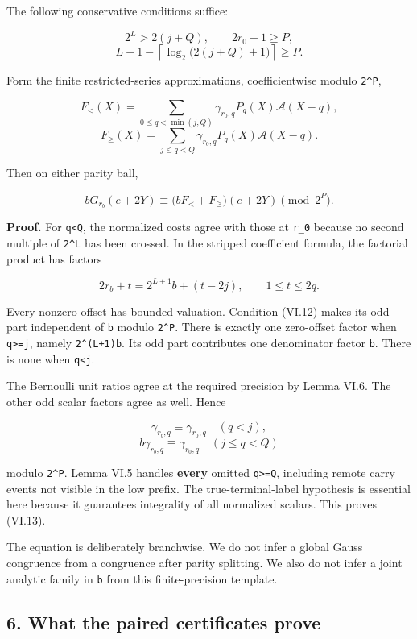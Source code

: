 \documentclass[11pt,letterpaper]{article}
\begin{document}
The following conservative conditions suffice:

\[
2^L>2(j+Q),\qquad 2r_0-1\ge P,
\] \[
L+1-\left\lceil\log_2\bigl(2(j+Q)+1\bigr)\right\rceil\ge P.
\tag{VI.12}
\]

Form the finite restricted-series approximations, coefficientwise modulo \texttt{2\^{}P},

\[
F_{<}(X)=\sum_{0\le q<\min(j,Q)}
\gamma_{r_0,q}P_q(X)\mathscr A(X-q),
\] \[
F_{\ge}(X)=\sum_{j\le q<Q}
\gamma_{r_0,q}P_q(X)\mathscr A(X-q).
\]

Then on either parity ball,

\[
\boxed{
bG_{r_b}(e+2Y)
\equiv
\bigl(bF_<+F_{\ge}\bigr)(e+2Y)
\pmod{2^P}.
} \tag{VI.13}
\]

\textbf{Proof.} For \texttt{q\textless{}Q}, the normalized costs agree with those at \texttt{r\_0} because no second multiple of \texttt{2\^{}L} has been crossed. In the stripped coefficient formula, the factorial product has factors

\[
2r_b+t=2^{L+1}b+(t-2j),\qquad 1\le t\le2q.
\]

Every nonzero offset has bounded valuation. Condition (VI.12) makes its odd part independent of \texttt{b} modulo \texttt{2\^{}P}. There is exactly one zero-offset factor when \texttt{q\textgreater{}=j}, namely \texttt{2\^{}(L+1)b}. Its odd part contributes one denominator factor \texttt{b}. There is none when \texttt{q\textless{}j}.

The Bernoulli unit ratios agree at the required precision by Lemma VI.6. The other odd scalar factors agree as well. Hence

\[
\gamma_{r_b,q}\equiv\gamma_{r_0,q}\quad(q<j),
\] \[
b\gamma_{r_b,q}\equiv\gamma_{r_0,q}\quad(j\le q<Q)
\]

modulo \texttt{2\^{}P}. Lemma VI.5 handles \textbf{every} omitted \texttt{q\textgreater{}=Q}, including remote carry events not visible in the low prefix. The true-terminal-label hypothesis is essential here because it guarantees integrality of all normalized scalars. This proves (VI.13).

The equation is deliberately branchwise. We do not infer a global Gauss congruence from a congruence after parity splitting. We also do not infer a joint analytic family in \texttt{b} from this finite-precision template.

\subsection{6. What the paired certificates prove}\label{what-the-paired-certificates-prove}
\end{document}
